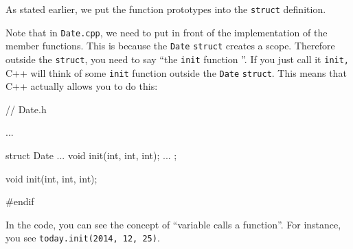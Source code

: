 As stated earlier, we put the function prototypes into the \texttt{struct} definition.

Note that in \texttt{Date.cpp}, we need to put  in
front of the implementation of the member functions. This is because the
\texttt{Date} \texttt{struct} creates a scope. Therefore outside the
\texttt{struct}, you need to say ``the \texttt{init} function \texttt{}''. If you just call it \texttt{init,} C++ will think
of some \texttt{init} function outside the \texttt{Date} \texttt{struct}. This means that
C++ actually allows you to do this:
\begin{consolethree}
// Date.h

...

struct Date
{
    ...
    void init(int, int, int);
    ...
};

void init(int, int, int);

#endif
\end{consolethree}
In the code, you can see the concept of ``variable calls a function''.
For instance, you see \texttt{today.init(2014, 12, 25)}.

